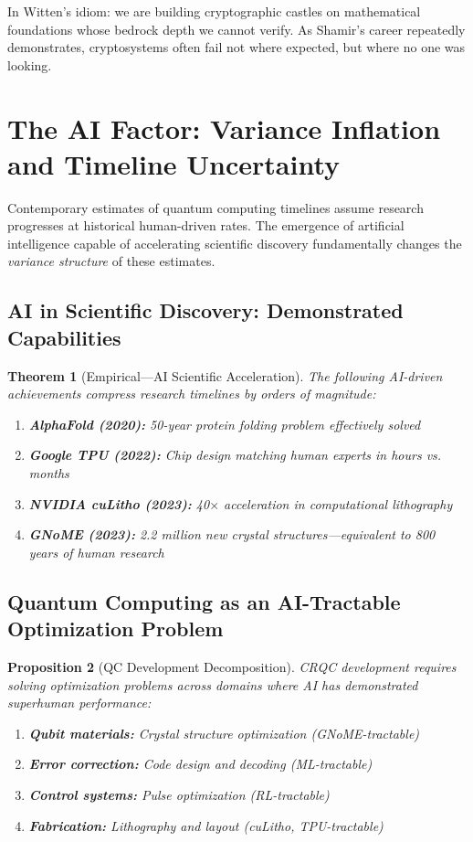 \documentclass[11pt,a4paper]{article}
\newtheorem{theorem}{Theorem}[section]
\newtheorem{proposition}[theorem]{Proposition}
\begin{document}
In Witten's idiom: we are building cryptographic castles on mathematical foundations whose bedrock depth we cannot verify. As Shamir's career repeatedly demonstrates, cryptosystems often fail not where expected, but where no one was looking.

\section{The AI Factor: Variance Inflation and Timeline Uncertainty}

Contemporary estimates of quantum computing timelines assume research progresses at historical human-driven rates. The emergence of artificial intelligence capable of accelerating scientific discovery fundamentally changes the \textit{variance structure} of these estimates.

\subsection{AI in Scientific Discovery: Demonstrated Capabilities}

\begin{theorem}[Empirical---AI Scientific Acceleration]
The following AI-driven achievements compress research timelines by orders of magnitude:
\begin{enumerate}[noitemsep]
    \item \textbf{AlphaFold (2020):} 50-year protein folding problem effectively solved
    \item \textbf{Google TPU (2022):} Chip design matching human experts in hours vs. months
    \item \textbf{NVIDIA cuLitho (2023):} 40$\times$ acceleration in computational lithography
    \item \textbf{GNoME (2023):} 2.2 million new crystal structures---equivalent to 800 years of human research
\end{enumerate}
\end{theorem}

\subsection{Quantum Computing as an AI-Tractable Optimization Problem}

\begin{proposition}[QC Development Decomposition]
CRQC development requires solving optimization problems across domains where AI has demonstrated superhuman performance:
\begin{enumerate}[noitemsep]
    \item \textbf{Qubit materials:} Crystal structure optimization (GNoME-tractable)
    \item \textbf{Error correction:} Code design and decoding (ML-tractable)
    \item \textbf{Control systems:} Pulse optimization (RL-tractable)
    \item \textbf{Fabrication:} Lithography and layout (cuLitho, TPU-tractable)
\end{enumerate}
\end{proposition}
\end{document}
